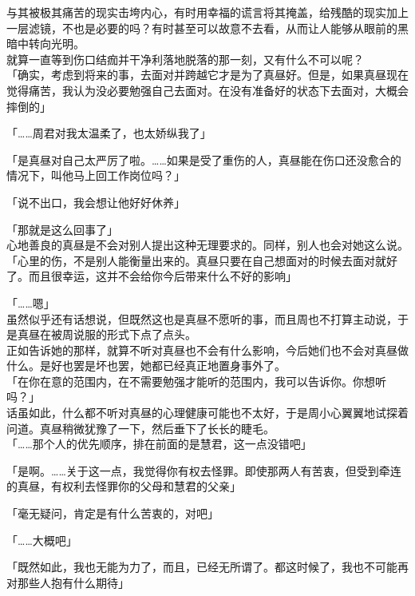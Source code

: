 与其被极其痛苦的现实击垮内心，有时用幸福的谎言将其掩盖，给残酷的现实加上一层滤镜，不也是必要的吗？有时甚至可以故意不去看，从而让人能够从眼前的黑暗中转向光明。\\

就算一直等到伤口结痂并干净利落地脱落的那一刻，又有什么不可以呢？\\

「确实，考虑到将来的事，去面对并跨越它才是为了真昼好。但是，如果真昼现在觉得痛苦，我认为没必要勉强自己去面对。在没有准备好的状态下去面对，大概会摔倒的」

「……周君对我太温柔了，也太娇纵我了」

「是真昼对自己太严厉了啦。……如果是受了重伤的人，真昼能在伤口还没愈合的情况下，叫他马上回工作岗位吗？」

「说不出口，我会想让他好好休养」

「那就是这么回事了」\\

心地善良的真昼是不会对别人提出这种无理要求的。同样，别人也会对她这么说。\\

「心里的伤，不是别人能衡量出来的。真昼只要在自己想面对的时候去面对就好了。而且很幸运，这并不会给你今后带来什么不好的影响」

「……嗯」\\

虽然似乎还有话想说，但既然这也是真昼不愿听的事，而且周也不打算主动说，于是真昼在被周说服的形式下点了点头。\\

正如告诉她的那样，就算不听对真昼也不会有什么影响，今后她们也不会对真昼做什么。是好也罢是坏也罢，她都已经真正地置身事外了。\\

「在你在意的范围内，在不需要勉强才能听的范围内，我可以告诉你。你想听吗？」\\

话虽如此，什么都不听对真昼的心理健康可能也不太好，于是周小心翼翼地试探着问道。真昼稍微犹豫了一下，然后垂下了长长的睫毛。\\

「……那个人的优先顺序，排在前面的是慧君，这一点没错吧」

「是啊。……关于这一点，我觉得你有权去怪罪。即使那两人有苦衷，但受到牵连的真昼，有权利去怪罪你的父母和慧君的父亲」

「毫无疑问，肯定是有什么苦衷的，对吧」

「……大概吧」

「既然如此，我也无能为力了，而且，已经无所谓了。都这时候了，我也不可能再对那些人抱有什么期待」

